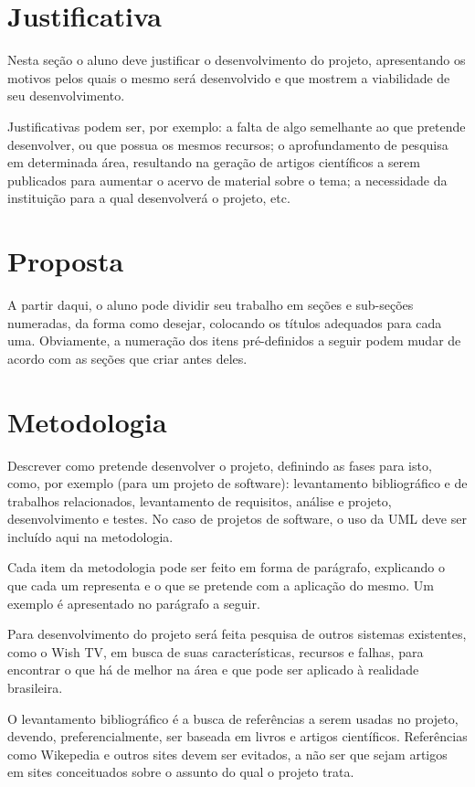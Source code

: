 \documentclass[12pt]{article}
\begin{document}
\section{Justificativa} \label{sec:justificativa}

Nesta seção o aluno deve justificar o desenvolvimento do projeto, apresentando os motivos pelos quais o mesmo será desenvolvido e que mostrem a viabilidade de seu desenvolvimento. 

Justificativas podem ser, por exemplo: a falta de algo semelhante ao que pretende desenvolver, ou que possua os mesmos recursos; o aprofundamento de pesquisa em determinada área, resultando na geração de artigos científicos a serem publicados para aumentar o acervo de material sobre o tema; a necessidade da instituição para a qual desenvolverá o projeto, etc.

\section{Proposta} \label{sec:proposta}
A partir daqui, o aluno pode dividir seu trabalho em seções e sub-seções numeradas, da forma como desejar, colocando os títulos adequados para cada uma. Obviamente, a numeração dos itens pré-definidos a seguir podem mudar de acordo com as seções que criar antes deles.

\section{Metodologia} \label{sec:metodologia}

Descrever como pretende desenvolver o projeto, definindo as fases para isto, como, por exemplo (para um projeto de software): levantamento bibliográfico e de trabalhos relacionados, levantamento de requisitos, análise e projeto, desenvolvimento e testes. No caso de projetos de software, o uso da UML deve ser incluído aqui na metodologia.

Cada item da metodologia pode ser feito em forma de parágrafo, explicando o que cada um representa e o que se pretende com a aplicação do mesmo. Um exemplo é apresentado no parágrafo a seguir.

Para desenvolvimento do projeto será feita pesquisa de outros sistemas existentes, como o Wish TV, em busca de suas características, recursos e falhas, para encontrar o que há de melhor na área e que pode ser aplicado à realidade brasileira. 

O levantamento bibliográfico é a busca de referências a serem usadas no projeto, devendo,  preferencialmente, ser baseada em livros e artigos científicos. Referências como Wikepedia e outros sites devem ser evitados, a não ser que sejam artigos em sites conceituados sobre o assunto do qual o projeto trata.
\end{document}
